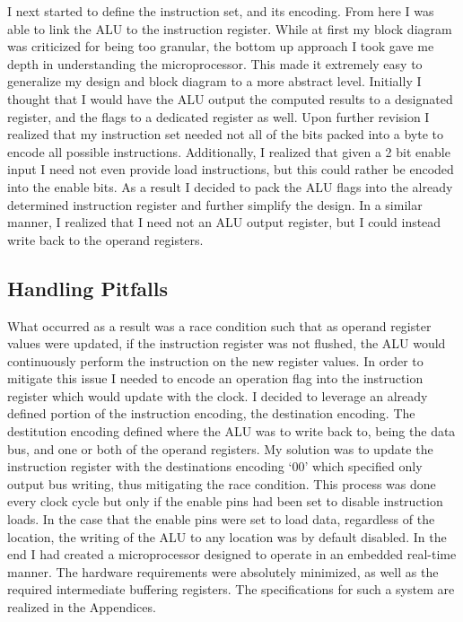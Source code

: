 \documentclass{article}
\begin{document}
I next started to define the instruction set, and its encoding.
From here I was able to link the ALU to the instruction register.
While at first my block diagram was criticized for being too granular, the bottom up approach I took gave me depth in understanding the microprocessor.
This made it extremely easy to generalize my design and block diagram to a more abstract level.
Initially I thought that I would have the ALU output the computed results to a designated register, and the flags to a dedicated register as well.
Upon further revision I realized that my instruction set needed not all of the bits packed into a byte to encode all possible instructions.
Additionally, I realized that given a 2 bit enable input I need not even provide load instructions, but this could rather be encoded into the enable bits.
As a result I decided to pack the ALU flags into the already determined instruction register and further simplify the design.
In a similar manner, I realized that I need not an ALU output register, but I could instead write back to the operand registers.

\subsection{Handling Pitfalls}
What occurred as a result was a race condition such that as operand register values were updated, if the instruction register was not flushed, the ALU would continuously perform the instruction on the new register values.
In order to mitigate this issue I needed to encode an operation flag into the instruction register which would update with the clock.
I decided to leverage an already defined portion of the instruction encoding, the destination encoding.
The destitution encoding defined where the ALU was to write back to, being the data bus, and one or both of the operand registers.
My solution was to update the instruction register with the destinations encoding `00' which specified only output bus writing, thus mitigating the race condition.
This process was done every clock cycle but only if the enable pins had been set to disable instruction loads.
In the case that the enable pins were set to load data, regardless of the location, the writing of the ALU to any location was by default disabled.
In the end I had created a microprocessor designed to operate in an embedded real-time manner.
The hardware requirements were absolutely minimized, as well as the required intermediate buffering registers.
The specifications for such a system are realized in the Appendices.
\end{document}
